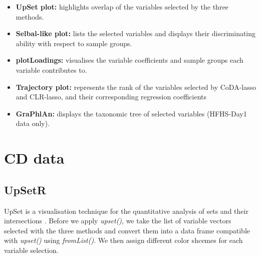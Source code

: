 \documentclass[openany]{book}
\providecommand{\tightlist}{%
  \setlength{\itemsep}{0pt}\setlength{\parskip}{0pt}}
\begin{document}
\begin{itemize}
\tightlist
\item
  \textbf{UpSet plot:} highlights overlap of the variables selected by
  the three methods.
\item
  \textbf{Selbal-like plot:} lists the selected variables and displays
  their discriminating ability with respect to sample groups.
\item
  \textbf{plotLoadings:} visualises the variable coefficients and sample
  groups each variable contributes to.
\item
  \textbf{Trajectory plot:} represents the rank of the variables
  selected by CoDA-lasso and CLR-lasso, and their corresponding
  regression coefficients
\item
  \textbf{GraPhlAn:} displays the taxonomic tree of selected variables
  (HFHS-Day1 data only).
\end{itemize}

\section{CD data}\label{cd-data-3}

\subsection{UpSetR}\label{upsetr}

UpSet is a visualisation technique for the quantitative analysis of sets
and their intersections \citep{lex2014upset}. Before we apply
\emph{upset()}, we take the list of variable vectors selected with the
three methods and convert them into a data frame compatible with
\emph{upset()} using \emph{fromList()}. We then assign different color
shcemes for each variable selection.
\end{document}
